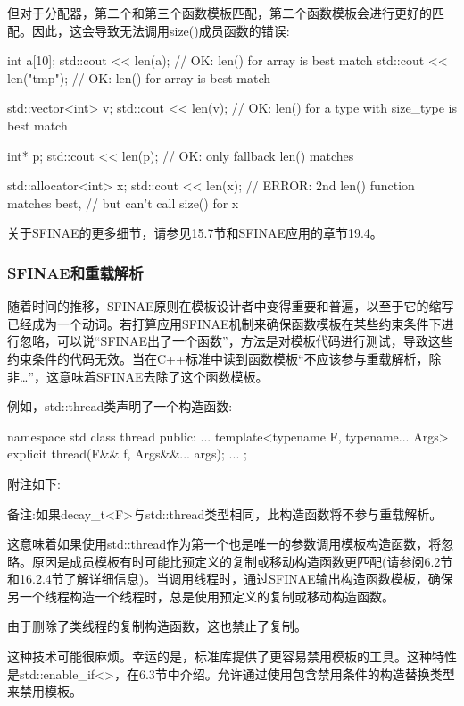 但对于分配器，第二个和第三个函数模板匹配，第二个函数模板会进行更好的匹配。因此，这会导致无法调用size()成员函数的错误:

\begin{cpp}
int a[10];
std::cout << len(a); // OK: len() for array is best match
std::cout << len("tmp"); // OK: len() for array is best match

std::vector<int> v;
std::cout << len(v); // OK: len() for a type with size_type is best match

int* p;
std::cout << len(p); // OK: only fallback len() matches

std::allocator<int> x;
std::cout << len(x); // ERROR: 2nd len() function matches best,
					 // but can’t call size() for x
\end{cpp}

关于SFINAE的更多细节，请参见15.7节和SFINAE应用的章节19.4。

\subsubsection{SFINAE和重载解析}

随着时间的推移，SFINAE原则在模板设计者中变得重要和普遍，以至于它的缩写已经成为一个动词。若打算应用SFINAE机制来确保函数模板在某些约束条件下进行忽略，可以说“SFINAE出了一个函数”，方法是对模板代码进行测试，导致这些约束条件的代码无效。当在C++标准中读到函数模板“不应该参与重载解析，除非…”，这意味着SFINAE去除了这个函数模板。

例如，std::thread类声明了一个构造函数:

\begin{cpp}
namespace std {
class thread {
public:
	...
	template<typename F, typename... Args>
	explicit thread(F&& f, Args&&... args);
	...
};
}
\end{cpp}

附注如下:

备注:如果decay\_t<F>与std::thread类型相同，此构造函数将不参与重载解析。

这意味着如果使用std::thread作为第一个也是唯一的参数调用模板构造函数，将忽略。原因是成员模板有时可能比预定义的复制或移动构造函数更匹配(请参阅6.2节和16.2.4节了解详细信息)。当调用线程时，通过SFINAE输出构造函数模板，确保另一个线程构造一个线程时，总是使用预定义的复制或移动构造函数。

\begin{notice}
由于删除了类线程的复制构造函数，这也禁止了复制。
\end{notice}

这种技术可能很麻烦。幸运的是，标准库提供了更容易禁用模板的工具。这种特性是std::enable\_if<>，在6.3节中介绍。允许通过使用包含禁用条件的构造替换类型来禁用模板。

